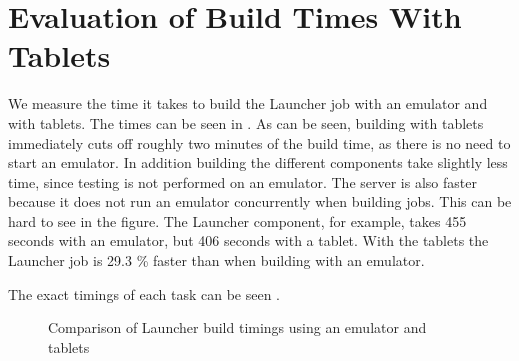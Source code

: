 \section{Evaluation of Build Times With Tablets}
We measure the time it takes to build the Launcher job with an emulator and with tablets. The times can be seen in . As can be seen, building with tablets immediately cuts off roughly two minutes of the build time, as there is no need to start an emulator. In addition building the different components take slightly less time, since testing is not performed on an emulator. The server is also faster because it does not run an emulator concurrently when building jobs. This can be hard to see in the figure. The Launcher component, for example, takes 455 seconds with an emulator, but 406 seconds with a tablet. With the tablets the Launcher job is 29.3 \% faster than when building with an emulator.

The exact timings of each task can be seen .

\begin{figure}
\centering
{}
\caption{Comparison of Launcher build timings using an emulator and tablets}\label{fig:launcher_build_times_3}
\end{figure}